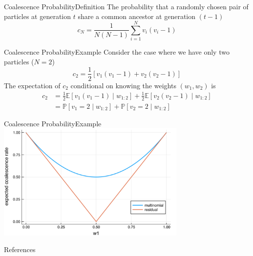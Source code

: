 \documentclass[aspectratio=169]{beamer}
\theoremstyle{definition}
\newcommand{\PR}{\mathbb{P}}
\newcommand{\E}{\mathbb{E}}
\newcommand{\vt}[1]{v_{#1}}
\newcommand{\wt}[1]{w_{#1}}
\begin{document}
\begin{frame}{Coalescence Probability}{Definition}
The probability that a randomly chosen pair of particles at generation $t$ share a common ancestor at generation $(t-1)$
\begin{equation*}
c_N = \frac{1}{N(N-1)} \sum_{i=1}^N \vt{i}(\vt{i}-1)
\end{equation*}

\end{frame}


\begin{frame}{Coalescence Probability}{Example}
Consider the case where we have only two particles ($N=2$)
\begin{equation*}
c_2 = \frac{1}{2}\left[ \vt{1}(\vt{1}-1) + \vt{2}(\vt{2}-1)\right]
\end{equation*}
The expectation of $c_2$ conditional on knowing the weights $(\wt{1}, \wt{2})$ is
\begin{align*}
c_2 &= \frac{1}{2} \E[\vt{1}(\vt{1}-1) \mid \wt{1:2}] + \frac{1}{2} \E[\vt{2}(\vt{2}-1) \mid \wt{1:2}] \\
&= \PR[\vt{1}=2 \mid \wt{1:2}] + \PR[\vt{2}=2 \mid \wt{1:2}]
\end{align*}

%
\end{frame}


\begin{frame}{Coalescence Probability}{Example}
\centering
\includegraphics[width=0.7\textwidth]{EcN_mn_res_n2.pdf}

\end{frame}


\begin{frame}[allowframebreaks]{References}

{\small 
%
}
\end{frame}
\end{document}
